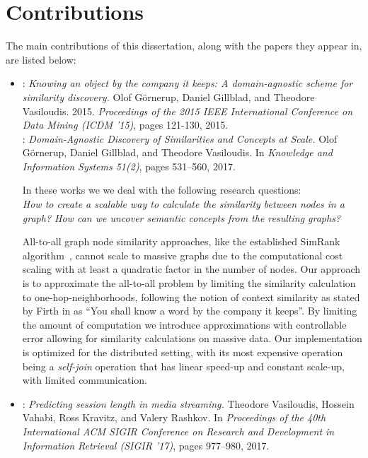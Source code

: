 \section{Contributions}

The main contributions of this dissertation, along with the papers they appear in,
are listed below:

\begin{itemize}
	\item \textbf{\conceptsicdm}: \emph{Knowing an object by the company it keeps: A domain-agnostic scheme for similarity discovery.}
	Olof G\"{o}rnerup, Daniel Gillblad, and Theodore Vasiloudis. 2015.
	\emph{Proceedings of the 2015 IEEE International Conference on Data Mining (ICDM '15)}, pages 121-130, 2015. \\
	\textbf{\conceptskais}: \emph{Domain-Agnostic Discovery of Similarities and Concepts at Scale.}
	Olof G\"{o}rnerup, Daniel Gillblad, and Theodore Vasiloudis. In \emph{Knowledge and
	Information Systems 51(2)}, pages 531--560, 2017.

	In these works we we deal with the following research questions:\\
	\emph{How to create a scalable way to calculate the similarity between nodes
	in a graph? How can we uncover semantic concepts from the resulting graphs?
	}

	All-to-all graph node similarity approaches, like the established SimRank algorithm~\cite{simrank},
	cannot scale to massive graphs due to the computational cost scaling with at least a quadratic
	factor in the number of nodes. Our approach is to approximate the all-to-all problem
	by limiting the similarity calculation to one-hop-neighborhoods, following the
	notion of context similarity as stated by Firth in \cite{firth} as ``You shall know
	a word by the company it keeps''. By limiting the amount of computation we introduce
	approximations with controllable error allowing for similarity calculations on massive
	data. Our implementation is optimized for the distributed setting, with its most
	expensive operation being a \emph{self-join} operation that has linear speed-up and
	constant scale-up, with limited communication.

	\item \textbf{\sessionlength}:
	\emph{Predicting session length in media streaming.} Theodore Vasiloudis, Hossein Vahabi, Ross Kravitz, and Valery Rashkov. In \emph{Proceedings of the 40th
	International ACM SIGIR Conference on Research and Development in Information
	Retrieval (SIGIR '17)}, pages 977--980, 2017.


\end{itemize}
